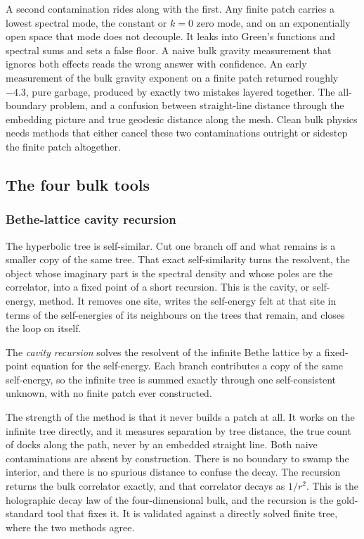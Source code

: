 A second contamination rides along with the first. Any finite patch carries a lowest spectral mode, the constant or $k=0$ zero mode, and on an exponentially open space that mode does not decouple. It leaks into Green's functions and spectral sums and sets a false floor. A naive bulk gravity measurement that ignores both effects reads the wrong answer with confidence. An early measurement of the bulk gravity exponent on a finite patch returned roughly $-4.3$, pure garbage, produced by exactly two mistakes layered together. The all-boundary problem, and a confusion between straight-line distance through the embedding picture and true geodesic distance along the mesh. Clean bulk physics needs methods that either cancel these two contaminations outright or sidestep the finite patch altogether.

\subsection{The four bulk tools}

\subsubsection{Bethe-lattice cavity recursion}

The hyperbolic tree is self-similar. Cut one branch off and what remains is a smaller copy of the same tree. That exact self-similarity turns the resolvent, the object whose imaginary part is the spectral density and whose poles are the correlator, into a fixed point of a short recursion. This is the cavity, or self-energy, method. It removes one site, writes the self-energy felt at that site in terms of the self-energies of its neighbours on the trees that remain, and closes the loop on itself.

\begin{definition}
The \emph{cavity recursion} solves the resolvent of the infinite Bethe lattice by a fixed-point equation for the self-energy. Each branch contributes a copy of the same self-energy, so the infinite tree is summed exactly through one self-consistent unknown, with no finite patch ever constructed.
\end{definition}

The strength of the method is that it never builds a patch at all. It works on the infinite tree directly, and it measures separation by tree distance, the true count of docks along the path, never by an embedded straight line. Both naive contaminations are absent by construction. There is no boundary to swamp the interior, and there is no spurious distance to confuse the decay. The recursion returns the bulk correlator exactly, and that correlator decays as $1/r^2$. This is the holographic decay law of the four-dimensional bulk, and the recursion is the gold-standard tool that fixes it. It is validated against a directly solved finite tree, where the two methods agree.

